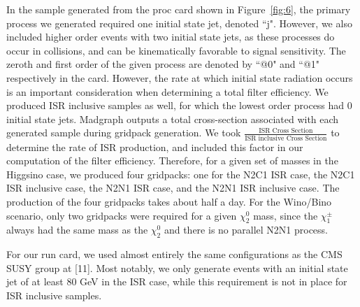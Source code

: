 \documentclass{article}
\begin{document}
In the sample generated from the proc card shown in Figure~\ref{fig:6}, the primary process we generated required one initial state jet, denoted ``j". However, we also included higher order events with two initial state jets, as these processes do occur in collisions, and can be kinematically favorable to signal sensitivity. The zeroth and first order of the given process are denoted by ``@0" and ``@1" respectively in the card. However, the rate at which initial state radiation occurs is an important consideration when determining a total filter efficiency. We produced ISR inclusive samples as well, for which the lowest order process had 0 initial state jets. Madgraph outputs a total cross-section associated with each generated sample during gridpack generation. We took $\frac{\text{ISR Cross Section}}{\text{ISR inclusive Cross Section}}$ to determine the rate of ISR production, and included this factor in our computation of the filter efficiency. Therefore, for a given set of masses in the Higgsino case, we produced four gridpacks: one for the N2C1 ISR case, the N2C1 ISR inclusive case, the N2N1 ISR case, and the N2N1 ISR inclusive case. The production of the four gridpacks takes about half a day. For the Wino/Bino scenario, only two gridpacks were required for a given $\chi^{0}_{2}$ mass, since the $\chi^{\pm}_{1}$ always had the same mass as the $\chi^{0}_{2}$ and there is no parallel N2N1 process.
\par
For our run card, we used almost entirely the same configurations as the CMS SUSY group at [11]. Most notably, we only generate events with an initial state jet of at least 80 GeV in the ISR case, while this requirement is not in place for ISR inclusive samples.
\end{document}
